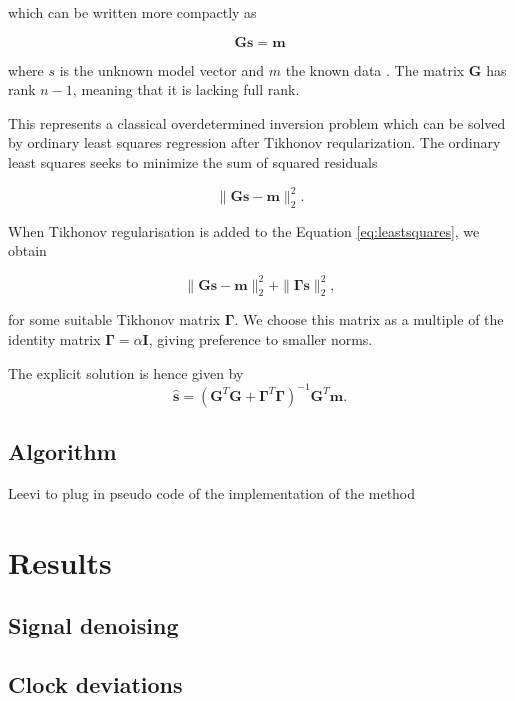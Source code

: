 \documentclass[12pt, sumlimits, intlimits]{article}
\begin{document}
which can be written more compactly as

\begin{equation}
\mathbf{Gs} = \mathbf{m}
\end{equation}

where $s$ is the unknown model vector and $m$ the known data \cite{sens2008}. The matrix $\mathbf{G}$ has rank $n-1$, meaning that it is lacking full rank. 

This represents a classical overdetermined inversion problem which can be solved by ordinary least squares regression after Tikhonov reqularization. The ordinary least squares seeks to minimize the sum of squared residuals

\begin{equation}
\| \mathbf{Gs}-\mathbf{m} \|_2^2.
\label{eq:leastsquares}
\end{equation}

When Tikhonov regularisation is added to the Equation \ref{eq:leastsquares}, we obtain

\begin{equation}
\| \mathbf{Gs}-\mathbf{m} \|_2^2 + \| \bm{\Gamma}\mathbf{s} \|_2^2,
\label{eq:tikhonov}
\end{equation}

for some suitable Tikhonov matrix $\bm{\Gamma}$. We choose this matrix as a multiple of the identity matrix $\bm{\Gamma} = \alpha\mathbf{I}$, giving preference to smaller norms. 

The explicit solution is hence given by 
\begin{equation}
\hat{\mathbf{s}} = (\mathbf{G}^T\mathbf{G} + \bm{\Gamma}^T\bm{\Gamma})^{-1}\mathbf{G}^T\mathbf{m}.  
\end{equation}

\subsection{Algorithm}
Leevi to plug in pseudo code of the implementation of the method

\section{Results}
\subsection{Signal denoising}


\subsection{Clock deviations}
\end{document}
